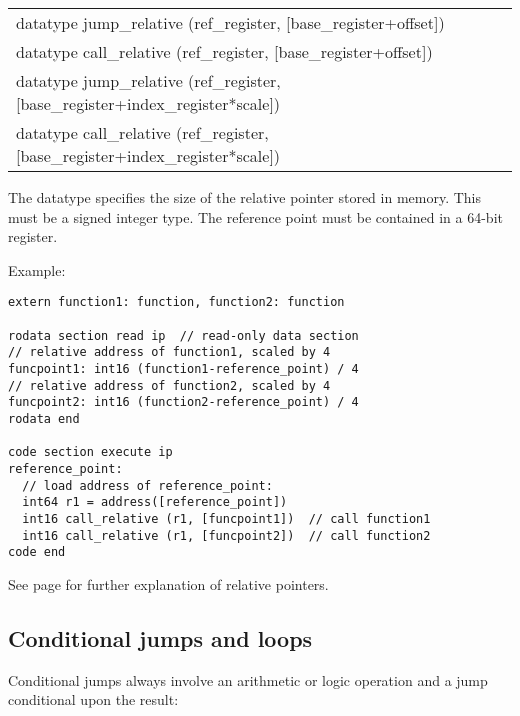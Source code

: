 \documentclass[forwardcom.tex]{subfiles}
\begin{document}
\begin{tabular}{|p{150mm}|}
\hline
\hspace{4mm} datatype jump\_relative (ref\_register, [base\_register+offset])\\
\hspace{4mm} datatype call\_relative (ref\_register, [base\_register+offset])\\
\hspace{4mm} datatype jump\_relative (ref\_register, [base\_register+index\_register*scale])\\
\hspace{4mm} datatype call\_relative (ref\_register, [base\_register+index\_register*scale])\\
\hline
\end{tabular}
\vspace{4mm}

The datatype specifies the size of the relative pointer stored in memory. This must be a signed integer type. The reference point must be contained in a 64-bit register.
\vv

Example:
\vv

\begin{lstlisting}[frame=single]
extern function1: function, function2: function

rodata section read ip  // read-only data section
// relative address of function1, scaled by 4
funcpoint1: int16 (function1-reference_point) / 4
// relative address of function2, scaled by 4
funcpoint2: int16 (function2-reference_point) / 4
rodata end

code section execute ip
reference_point:
  // load address of reference_point: 
  int64 r1 = address([reference_point])
  int16 call_relative (r1, [funcpoint1])  // call function1
  int16 call_relative (r1, [funcpoint2])  // call function2
code end

\end{lstlisting}

See page \pageref{relativeDataPointer} for further explanation of relative pointers.
\vspace{4mm}


\subsection{Conditional jumps and loops} \label{assemblyConditionalJumps}

Conditional jumps always involve an arithmetic or logic operation and a jump conditional upon the result:
\end{document}
